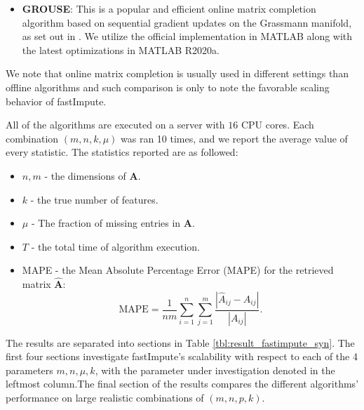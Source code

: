 \documentclass[twoside,11pt]{article}
\begin{document}
\begin{itemize}
	\item \textbf{GROUSE}: This is a popular and efficient online matrix completion algorithm based on sequential gradient updates on the Grassmann manifold, as set out in \cite{balzano2010online}. We utilize the official implementation in MATLAB along with the latest optimizations in MATLAB R2020a. 
\end{itemize}
We 
 note that online matrix completion is usually used in different settings than offline algorithms and such comparison is only to note the favorable scaling behavior of fastImpute.

 All of the algorithms are executed on a server with $16$ CPU cores. Each combination $(m,n,k,\mu)$ was ran 10 times, and we report the average value of every statistic. The statistics reported are as followed:
\begin{itemize}
	\item $n,m$ - the dimensions of $\bm{A}$.
	\item $k$ - the true number of features.
	\item $\mu$ - The fraction of missing entries in $\bm{A}$.
	\item $T$ - the total time of algorithm execution.
	\item MAPE - the Mean Absolute Percentage Error (MAPE) for the retrieved matrix $\hat{\bm{A}}$:
	\[\text{MAPE}=\frac{1}{nm} \sum_{i=1}^n \sum_{j=1}^m \frac{|\hat{A}_{ij}-A_{ij} |}{|A_{ij}|}. \]
\end{itemize}
The results are separated into sections in Table \ref{tbl:result_fastimpute_syn}. The first four sections investigate fastImpute's scalability with respect to each of the 4 parameters $m,n,\mu, k$, with the parameter under investigation denoted in the leftmost column.The final section of the results compares the different algorithms' performance on large realistic combinations of $(m,n,p,k)$.
\end{document}
